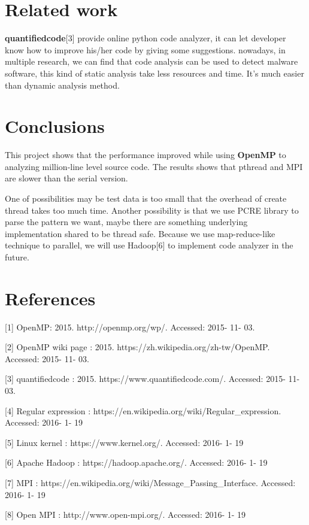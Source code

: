 \documentclass{acm_proc_article-sp}
\begin{document}
\section{Related work}

	\textbf{quantifiedcode}[3] provide online python code analyzer, it can let developer 
	know how to improve his/her code by giving some suggestions.
	nowadays, in multiple research, we can find that code analysis can be used to 
	detect malware software, this kind of static analysis take less resources and time. 
	It's much easier than dynamic analysis method.

\section{Conclusions}
	This project shows that the performance improved while using \textbf{OpenMP} to analyzing million-line
	level source code. The results 	shows that pthread and MPI are slower than the serial version.
	
	One of possibilities may be test data is too small that the overhead of create thread takes too much time.
	Another possibility is that we use PCRE library to parse the pattern we want, maybe there are something
	underlying implementation shared to be thread safe. Because we use map-reduce-like technique to
	parallel, we will use Hadoop[6] to implement code analyzer in the future.

\section{References}
[1] OpenMP: 2015. http://openmp.org/wp/. Accessed: 2015- 11- 03.

[2] OpenMP wiki page : 2015. https://zh.wikipedia.org/zh-tw/OpenMP. Accessed: 2015- 11- 03.

[3] quantifiedcode : 2015. https://www.quantifiedcode.com/. Accessed: 2015- 11- 03.

[4] Regular expression : https://en.wikipedia.org/wiki/Regular\_expression. Accessed: 2016- 1- 19

[5] Linux kernel : https://www.kernel.org/. Accessed: 2016- 1- 19

[6] Apache Hadoop : https://hadoop.apache.org/. Accessed: 2016- 1- 19

[7] MPI : https://en.wikipedia.org/wiki/Message\_Passing\_Interface. Accessed: 2016- 1- 19

[8] Open MPI : http://www.open-mpi.org/. Accessed: 2016- 1- 19
\end{document}
